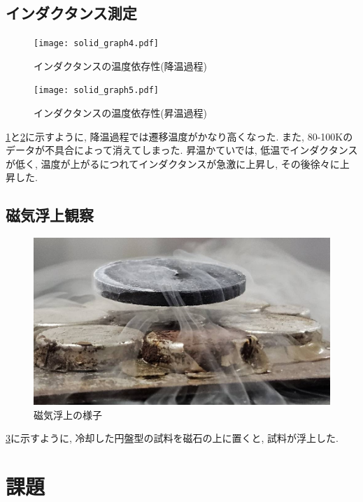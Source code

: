 \documentclass[11pt]{ltjsarticle}
\begin{document}
    \subsection*{インダクタンス測定}
      \begin{minipage}[H]{0.48\textwidth}
        \centering
        \begin{figure}[H]
          \centering
          \texttt{[image: solid\_graph4.pdf]}
          \caption{インダクタンスの温度依存性(降温過程)}
          \label{fig:inductance_cooling}
        \end{figure}
      \end{minipage}
      \begin{minipage}[H]{0.48\textwidth}
        \centering
        \begin{figure}[H]
          \centering
          \texttt{[image: solid\_graph5.pdf]}
          \caption{インダクタンスの温度依存性(昇温過程)}
          \label{fig:inductance_warming}
        \end{figure}
      \end{minipage}
      \cref{fig:inductance_cooling}と\cref{fig:inductance_warming}に示すように, 降温過程では遷移温度がかなり高くなった. また, 80-100Kのデータが不具合によって消えてしまった. 昇温かていでは, 低温でインダクタンスが低く, 温度が上がるにつれてインダクタンスが急激に上昇し, その後徐々に上昇した.
    \subsection*{磁気浮上観察}
      \begin{figure}[H]
        \centering
        \includegraphics[width=0.6\columnwidth]{79001.jpg}
        \caption{磁気浮上の様子}
        \label{fig:levitation}
      \end{figure}
      \cref{fig:levitation}に示すように, 冷却した円盤型の試料を磁石の上に置くと, 試料が浮上した.
  \section*{課題}
\end{document}
